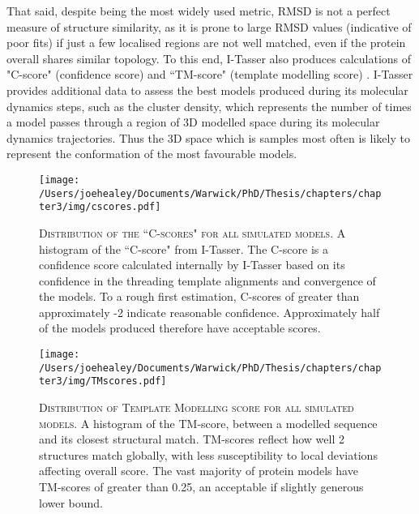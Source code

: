That said, despite being the most widely used metric, RMSD is not a perfect measure of structure similarity, as it is prone to large RMSD values (indicative of poor fits) if just a few localised regions are not well matched, even if the protein overall shares similar topology. To this end, I-Tasser also produces calculations of "C-score" (confidence score) and ``TM-score" (template modelling score) \citep{Zhang2005}. I-Tasser provides additional data to assess the best models produced during its molecular dynamics steps, such as the cluster density, which represents the number of times a model passes through a region of 3D modelled space during its molecular dynamics trajectories. Thus the 3D space which is samples most often is likely to represent the conformation of the most favourable models.

\begin{figure}[p]
\centering
{}
\texttt{[image: /Users/joehealey/Documents/Warwick/PhD/Thesis/chapters/chapter3/img/cscores.pdf]}
	\captionsetup{singlelinecheck=off, justification=justified, font=footnotesize, aboveskip=7pt}
	\caption[I-Tasser model accuracy distribution - C-score]{\textsc{\normalsize Distribution of the ``C-scores" for all simulated models.}\vspace{0.1cm} \newline A histogram of the ``C-score" from I-Tasser. The C-score is a confidence score calculated internally by I-Tasser based on its confidence in the threading template alignments and convergence of the models. To a rough first estimation, C-scores of greater than approximately -2 indicate reasonable confidence. Approximately half of the models produced therefore have acceptable scores.}
	\label{cscorehist}
\end{figure}
\begin{figure}[p]
\centering
{}
\texttt{[image: /Users/joehealey/Documents/Warwick/PhD/Thesis/chapters/chapter3/img/TMscores.pdf]}
	\captionsetup{singlelinecheck=off, justification=justified, font=footnotesize, aboveskip=7pt}
	\caption[I-Tasser model accuracy distribution TM-score]{\textsc{\normalsize Distribution of Template Modelling score for all simulated models.}\vspace{0.1cm} \newline A histogram of the TM-score, between a modelled sequence and its closest structural match. TM-scores reflect how well 2 structures match globally, with less susceptibility to local deviations affecting overall score. The vast majority of protein models have TM-scores of greater than 0.25, an acceptable if slightly generous lower bound.}
	\label{tmscorehist}
\end{figure}

